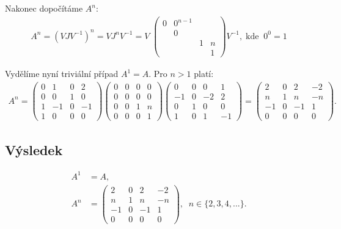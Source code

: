 \documentclass[]{article}
\begin{document}
\medskip
\medskip

Nakonec dopočítáme $A^n$:
\begin{align*}
    A^n
    = (V J V^{-1})^n
    = V J^n V^{-1}
    = V \; \begin{pmatrix}
        0 & 0^{n-1} \\
          & 0 \\
          &   & 1 & n \\
          &   &   & 1
    \end{pmatrix}
    V^{-1}
    \mathrm{,\;kde}\;\;
    0^0 = 1
\end{align*}

\medskip
\medskip

Vydělíme nyní triviální případ $A^1=A$. Pro $n>1$ platí:
\begin{align*}
    A^n =
    \begin{pmatrix}
        0 & 1 & 0 & 2\\
        0 & 0 & 1 & 0\\
        1 &-1 & 0 & -1\\
        1 & 0 & 0 & 0
    \end{pmatrix}
    \begin{pmatrix}
        0 & 0 & 0 & 0 \\
        0 & 0 & 0 & 0 \\
        0 & 0 & 1 & n \\
        0 & 0 & 0 & 1        
    \end{pmatrix}
    \begin{pmatrix}
        0 & 0 & 0 & 1 \\
       -1 & 0 &-2 & 2 \\
        0 & 1 & 0 & 0 \\
        1 & 0 & 1 &-1
    \end{pmatrix}
    =
    \begin{pmatrix}
        2 & 0 & 2 &-2 \\
        n & 1 & n &-n \\
        -1& 0 &-1 & 1 \\
        0 & 0 & 0 & 0
    \end{pmatrix}.
\end{align*}

\subsection{Výsledek}
\begin{align*}
    A^1 &= A, \\
    A^n &= 
    \begin{pmatrix}
        2 & 0 & 2 &-2 \\
        n & 1 & n &-n \\
        -1& 0 &-1 & 1 \\
        0 & 0 & 0 & 0
    \end{pmatrix}, \;\; n \in \{2, 3, 4, ...\}.
\end{align*}
\end{document}
